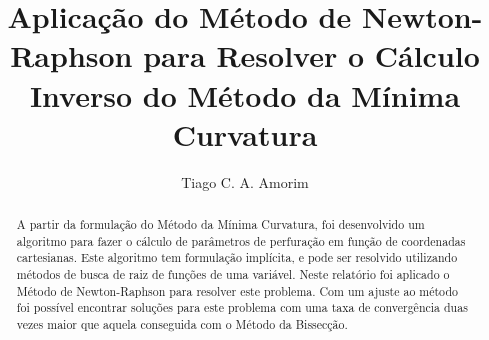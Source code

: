\documentclass[final,5p]{elsarticle}
\numberwithin{equation}{section}
\begin{document}
\begin{frontmatter}



\title{Aplicação do Método de Newton-Raphson para Resolver o Cálculo Inverso do Método da Mínima Curvatura}


\author{Tiago C. A. Amorim}

\begin{abstract}

    A partir da formulação do Método da Mínima Curvatura, foi desenvolvido um algoritmo para fazer o cálculo de parâmetros de perfuração em função de coordenadas cartesianas. Este algoritmo tem formulação implícita, e pode ser resolvido utilizando métodos de busca de raiz de funções de uma variável. Neste relatório foi aplicado o Método de Newton-Raphson para resolver este problema. Com um ajuste ao método foi possível encontrar soluções para este problema com uma taxa de convergência duas vezes maior que aquela conseguida com o Método da Bissecção.


\end{abstract}
\end{frontmatter}
\end{document}
